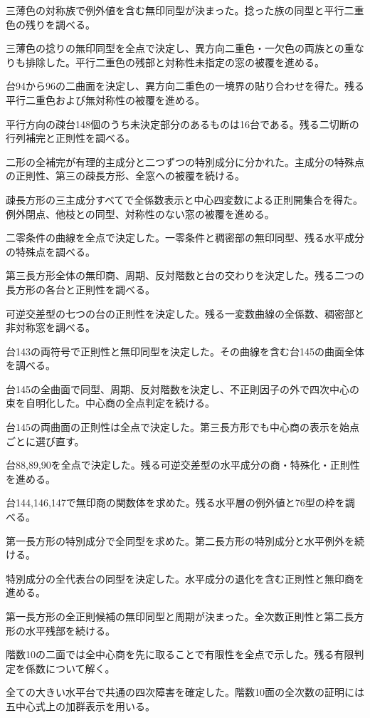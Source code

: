 \documentclass[11pt,a4paper]{ltjsarticle}
\begin{document}
三薄色の対称族で例外値を含む無印同型が決まった。捻った族の同型と平行二重色の残りを調べる。

三薄色の捻りの無印同型を全点で決定し、異方向二重色・一欠色の両族との重なりも排除した。平行二重色の残部と対称性未指定の窓の被覆を進める。

台94から96の二曲面を決定し、異方向二重色の一境界の貼り合わせを得た。残る平行二重色および無対称性の被覆を進める。

平行方向の疎台148個のうち未決定部分のあるものは16台である。残る二切断の行列補完と正則性を調べる。

二形の全補完が有理的主成分と二つずつの特別成分に分かれた。主成分の特殊点の正則性、第三の疎長方形、全窓への被覆を続ける。

疎長方形の三主成分すべてで全係数表示と中心四変数による正則開集合を得た。例外閉点、他枝との同型、対称性のない窓の被覆を進める。

二零条件の曲線を全点で決定した。一零条件と稠密部の無印同型、残る水平成分の特殊点を調べる。

第三長方形全体の無印商、周期、反対階数と台の交わりを決定した。残る二つの長方形の各台と正則性を調べる。

可逆交差型の七つの台の正則性を決定した。残る一変数曲線の全係数、稠密部と非対称窓を調べる。

台143の両符号で正則性と無印同型を決定した。その曲線を含む台145の曲面全体を調べる。

台145の全曲面で同型、周期、反対階数を決定し、不正則因子の外で四次中心の束を自明化した。中心商の全点判定を続ける。

台145の両曲面の正則性は全点で決定した。第三長方形でも中心商の表示を始点ごとに選び直す。

台88,89,90を全点で決定した。残る可逆交差型の水平成分の商・特殊化・正則性を進める。

台144,146,147で無印商の関数体を求めた。残る水平層の例外値と76型の枠を調べる。

第一長方形の特別成分で全同型を求めた。第二長方形の特別成分と水平例外を続ける。

特別成分の全代表台の同型を決定した。水平成分の退化を含む正則性と無印商を進める。

第一長方形の全正則候補の無印同型と周期が決まった。全次数正則性と第二長方形の水平残部を続ける。

階数10の二面では全中心商を先に取ることで有限性を全点で示した。残る有限判定を係数について解く。

全ての大きい水平台で共通の四次障害を確定した。階数10面の全次数の証明には五中心式上の加群表示を用いる。
\end{document}
